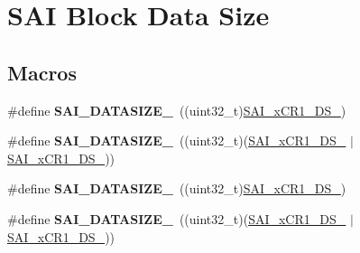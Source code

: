 \hypertarget{group___s_a_i___block___data___size}{}\section{S\+AI Block Data Size}
\label{group___s_a_i___block___data___size}
\subsection*{Macros}
\begin{DoxyCompactItemize}
\item 
\#define {\bfseries S\+A\+I\+\_\+\+D\+A\+T\+A\+S\+I\+Z\+E\+\_}~((uint32\+\_\+t)\hyperlink{group___peripheral___registers___bits___definition_ga4148a11a2d9ac1a97da766bd585e5c8a}{S\+A\+I\+\_\+x\+C\+R1\+\_\+\+D\+S\+\_})\hypertarget{group___s_a_i___block___data___size_gad119c879f244d3ea041396e5b89e0bbf}{}\label{group___s_a_i___block___data___size_gad119c879f244d3ea041396e5b89e0bbf}

\item 
\#define {\bfseries S\+A\+I\+\_\+\+D\+A\+T\+A\+S\+I\+Z\+E\+\_}~((uint32\+\_\+t)(\hyperlink{group___peripheral___registers___bits___definition_ga4148a11a2d9ac1a97da766bd585e5c8a}{S\+A\+I\+\_\+x\+C\+R1\+\_\+\+D\+S\+\_} $\vert$ \hyperlink{group___peripheral___registers___bits___definition_gabb5dd23287a176f80d241f0dfb8fcc7d}{S\+A\+I\+\_\+x\+C\+R1\+\_\+\+D\+S\+\_}))\hypertarget{group___s_a_i___block___data___size_ga1ca8a303023ad6977a5684a4736ec88a}{}\label{group___s_a_i___block___data___size_ga1ca8a303023ad6977a5684a4736ec88a}

\item 
\#define {\bfseries S\+A\+I\+\_\+\+D\+A\+T\+A\+S\+I\+Z\+E\+\_}~((uint32\+\_\+t)\hyperlink{group___peripheral___registers___bits___definition_gab50b27e8638b16d12ef00e80bf0f097e}{S\+A\+I\+\_\+x\+C\+R1\+\_\+\+D\+S\+\_})\hypertarget{group___s_a_i___block___data___size_ga042075171a0ad648532ef4f01b7ff4da}{}\label{group___s_a_i___block___data___size_ga042075171a0ad648532ef4f01b7ff4da}

\item 
\#define {\bfseries S\+A\+I\+\_\+\+D\+A\+T\+A\+S\+I\+Z\+E\+\_}~((uint32\+\_\+t)(\hyperlink{group___peripheral___registers___bits___definition_gab50b27e8638b16d12ef00e80bf0f097e}{S\+A\+I\+\_\+x\+C\+R1\+\_\+\+D\+S\+\_} $\vert$ \hyperlink{group___peripheral___registers___bits___definition_gabb5dd23287a176f80d241f0dfb8fcc7d}{S\+A\+I\+\_\+x\+C\+R1\+\_\+\+D\+S\+\_}))\hypertarget{group___s_a_i___block___data___size_ga5e077ab7e861d4c5622b794ddd57af0b}{}\label{group___s_a_i___block___data___size_ga5e077ab7e861d4c5622b794ddd57af0b}


\end{DoxyCompactItemize}
